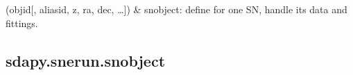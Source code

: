 \documentclass[letterpaper,10pt,english]{sphinxmanual}
\begin{document}
\begin{savenotes}\sphinxatlongtablestart\begin{longtable}[c]{}
\hline

\endfirsthead

%
{}\\
\hline

\endhead

\hline
{}\\
\endfoot

\endlastfoot

{\hyperref[\detokenize{generated/sdapy.snerun.snobject:sdapy.snerun.snobject}]{}}(objid{[}, aliasid, z, ra, dec, …{]})
&
snobject: define  for one SN, handle its data and fittings.
\\
\hline
\end{longtable}\sphinxatlongtableend\end{savenotes}


\subsection{sdapy.snerun.snobject}
\label{\detokenize{generated/sdapy.snerun.snobject:sdapy-snerun-snobject}}\label{\detokenize{generated/sdapy.snerun.snobject::doc}}
\end{document}
